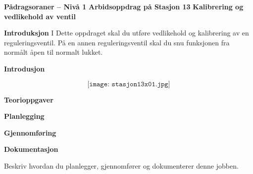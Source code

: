 

\noindent

\vskip 5pt

\vskip 5pt
\begin{center}
\textbf{Pådragsoraner -- Nivå 1 }
\vskip 5pt 
\textbf{Arbidsoppdrag på Stasjon 13}
\vskip 5pt 
\textbf{Kalibrering og vedlikehold av ventil}
\end{center}

\textbf{Introduksjon}
I Dette oppdraget skal du utføre vedlikehold og kalibrering av en reguleringsventil. På en annen reguleringsventil skal du snu funksjonen fra normålt åpen til normalt lukket. 







\vskip 10pt 
\textbf{Introdusjon}

\vskip 5pt 

\vskip 5pt 

$$\texttt{[image: stasjon13x01.jpg]}$$

\vskip 10pt 
\textbf{Teorioppgaver}

\vskip 5pt 

\vskip 10pt 
\textbf{Planlegging}


\vskip 10pt 
\textbf{Gjennomføring}

\vskip 10pt 
\textbf{Dokumentasjon}

Beskriv hvordan du planlegger, gjennomfører og dokumenterer denne jobben. 


















\vfil \eject


















